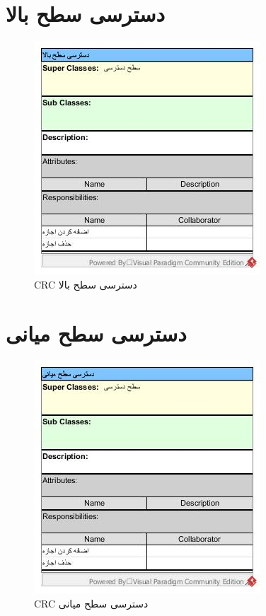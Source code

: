 \section{‌دسترسی سطح بالا}
\begin{figure}[H]
	\centering
	\includegraphics[scale=1]{img/crc/HighAccess}
	\caption{CRC دسترسی سطح بالا }
\end{figure}

\section{‌دسترسی سطح میانی}
\begin{figure}[H]
	\centering
	\includegraphics[scale=1]{img/crc/MiddleAccess}
	\caption{CRC دسترسی سطح میانی }
\end{figure}

